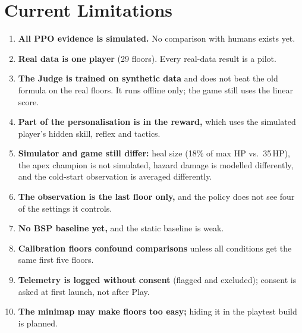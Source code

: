 \section{Current Limitations}
\label{sec:limitations}
\begin{enumerate}
    \item \textbf{All PPO evidence is simulated.} No comparison with humans exists yet.
    \item \textbf{Real data is one player} (29 floors). Every real-data result is a pilot.
    \item \textbf{The Judge is trained on synthetic data} and does not beat the old formula on the real floors. It runs offline only; the game still uses the linear score.
    \item \textbf{Part of the personalisation is in the reward,} which uses the simulated player's hidden skill, reflex and tactics.
    \item \textbf{Simulator and game still differ:} heal size (18\% of max HP vs.\ 35\,HP), the apex champion is not simulated, hazard damage is modelled differently, and the cold-start observation is averaged differently.
    \item \textbf{The observation is the last floor only,} and the policy does not see four of the settings it controls.
    \item \textbf{No BSP baseline yet,} and the static baseline is weak.
    \item \textbf{Calibration floors confound comparisons} unless all conditions get the same first five floors.
    \item \textbf{Telemetry is logged without consent} (flagged and excluded); consent is asked at first launch, not after Play.
    \item \textbf{The minimap may make floors too easy;} hiding it in the playtest build is planned.
\end{enumerate}
